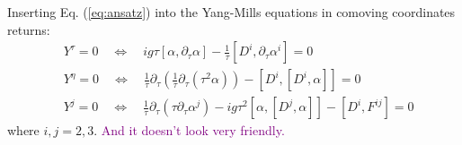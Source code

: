 Inserting Eq. (\ref{eq:ansatz}) into the Yang-Mills equations in comoving coordinates returns:
\begin{subequations}
	\begin{align}
		& Y^\tau = 0 \quad \Leftrightarrow \quad ig\tau \left[\alpha, \partial_\tau \alpha \right] - \frac{1}{\tau} \left[D^i, \partial_\tau \alpha^i \right] = 0 \\
		& Y^\eta = 0 \quad \Leftrightarrow \quad \frac{1}{\tau} \partial_\tau \left( \frac{1}{\tau} \partial_\tau \left( \tau^2 \alpha \right) \right) - \left[D^i, \left[D^i, \alpha \right] \right] = 0 \\
		& Y^j = 0 \quad \Leftrightarrow \quad \frac{1}{\tau} \partial_\tau \left( \tau \partial_\tau \alpha^j \right) - ig\tau^2 \left[\alpha, \left[D^j,\alpha \right] \right] - [D^i, F^{ij}] = 0
	\end{align}
\end{subequations}
where $i,j=2,3$. \textcolor{purple}{And it doesn't look very friendly.}

